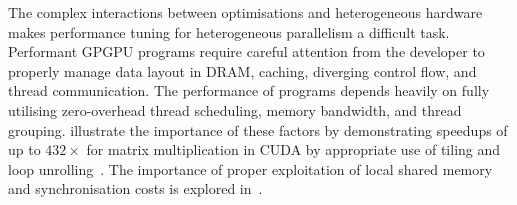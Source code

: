\documentclass[nonatbib,preprint,10pt]{sigplanconf}
\begin{document}





The complex interactions between optimisations and heterogeneous
hardware makes performance tuning for heterogeneous parallelism a
difficult task. Performant GPGPU programs require careful attention
from the developer to properly manage data layout in DRAM, caching,
diverging control flow, and thread communication. The performance of
programs depends heavily on fully utilising zero-overhead thread
scheduling, memory bandwidth, and thread
grouping. \citeauthor{Ryoo2008a} illustrate the importance of these
factors by demonstrating speedups of up to $432\times$ for matrix
multiplication in CUDA by appropriate use of tiling and loop
unrolling~\cite{Ryoo2008a}. The importance of proper exploitation of
local shared memory and synchronisation costs is explored
in~\cite{Lee2010}.
\end{document}
